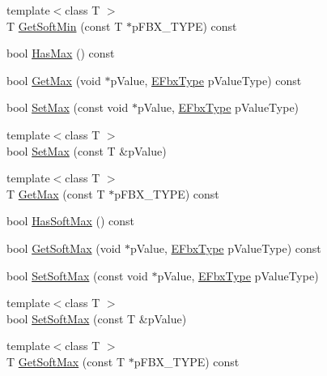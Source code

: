 \begin{Indent}
\begin{DoxyCompactItemize}
\item 
{\footnotesize template$<$class T $>$ }\\T \hyperlink{class_fbx_property_handle_a1f2a64b0088928db88a25dccb7c7d190}{Get\+Soft\+Min} (const T $\ast$p\+F\+B\+X\+\_\+\+T\+Y\+PE) const
\item 
bool \hyperlink{class_fbx_property_handle_ac14373e76b24b0b6ba5d99f9fef10a5f}{Has\+Max} () const
\item 
bool \hyperlink{class_fbx_property_handle_a4752eebe7303b15577355b8fbecd4c6b}{Get\+Max} (void $\ast$p\+Value, \hyperlink{fbxpropertytypes_8h_a73913a5ddfb20e57c6f25e9e6784bd92}{E\+Fbx\+Type} p\+Value\+Type) const
\item 
bool \hyperlink{class_fbx_property_handle_a5e41a6d59cd7a1b1c0325b7cf4476285}{Set\+Max} (const void $\ast$p\+Value, \hyperlink{fbxpropertytypes_8h_a73913a5ddfb20e57c6f25e9e6784bd92}{E\+Fbx\+Type} p\+Value\+Type)
\item 
{\footnotesize template$<$class T $>$ }\\bool \hyperlink{class_fbx_property_handle_abda2411b3b6fb98963c1009b3c2e1425}{Set\+Max} (const T \&p\+Value)
\item 
{\footnotesize template$<$class T $>$ }\\T \hyperlink{class_fbx_property_handle_a170bbeb8c9dc5a4a1a1de93a9328f897}{Get\+Max} (const T $\ast$p\+F\+B\+X\+\_\+\+T\+Y\+PE) const
\item 
bool \hyperlink{class_fbx_property_handle_ad89e57bd3b7cfe2758d8b95f252b8b9f}{Has\+Soft\+Max} () const
\item 
bool \hyperlink{class_fbx_property_handle_a2cc9715f192ec19f46f4baaef4baf075}{Get\+Soft\+Max} (void $\ast$p\+Value, \hyperlink{fbxpropertytypes_8h_a73913a5ddfb20e57c6f25e9e6784bd92}{E\+Fbx\+Type} p\+Value\+Type) const
\item 
bool \hyperlink{class_fbx_property_handle_ad4303ec2be34fb9d619fc98e68486784}{Set\+Soft\+Max} (const void $\ast$p\+Value, \hyperlink{fbxpropertytypes_8h_a73913a5ddfb20e57c6f25e9e6784bd92}{E\+Fbx\+Type} p\+Value\+Type)
\item 
{\footnotesize template$<$class T $>$ }\\bool \hyperlink{class_fbx_property_handle_a2581fff85d3c2e73c99d16f2b9c1a66e}{Set\+Soft\+Max} (const T \&p\+Value)
\item 
{\footnotesize template$<$class T $>$ }\\T \hyperlink{class_fbx_property_handle_a302beaa7745f9f5f3cd92e7b4f42d576}{Get\+Soft\+Max} (const T $\ast$p\+F\+B\+X\+\_\+\+T\+Y\+PE) const
\end{DoxyCompactItemize}
\end{Indent}
